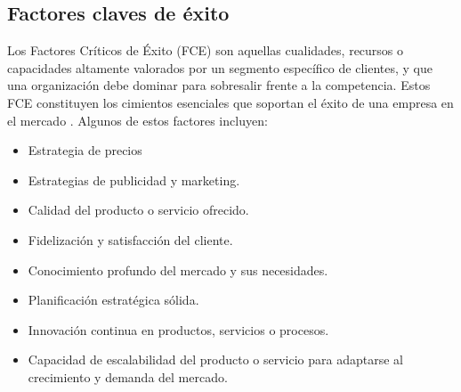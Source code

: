 
\color{red}
\subsection{Factores claves de éxito}

Los Factores Críticos de Éxito (FCE) son aquellas cualidades, recursos o capacidades altamente valorados por un segmento específico de clientes, y que una organización debe dominar para sobresalir frente a la competencia. Estos FCE constituyen los cimientos esenciales que soportan el éxito de una empresa en el mercado \cite{Asana}. Algunos de estos factores incluyen:

\begin{itemize}
    \item Estrategia de precios
    \item Estrategias de publicidad y marketing.
    \item Calidad del producto o servicio ofrecido. 
    \item Fidelización y satisfacción del cliente.
    \item Conocimiento profundo del mercado y sus necesidades.
    \item Planificación estratégica sólida. 
    \item Innovación continua en productos, servicios o procesos. 
    \item Capacidad de escalabilidad del producto o servicio para adaptarse al crecimiento y demanda del mercado. 
\end{itemize}